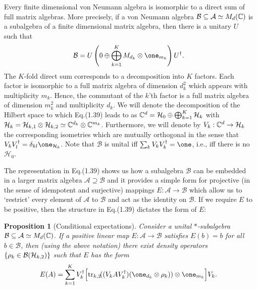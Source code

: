 \documentclass[11pt,a4paper]{article}
\theoremstyle{plain}
\newtheorem{proposition}{Proposition}[section]
\theoremstyle{definition}
\theoremstyle{remark}
\numberwithin{equation}{section}
\begin{document}
Every finite dimensional von Neumann algebra is isomorphic to a direct sum of full matrix algebras. More precisely, if a von Neumann algebra $\mathcal{B}\subseteq \mathcal{A}\simeq M_d(\mathbb{C})$ is a subalgebra of a finite dimensional matrix algebra, then there is a unitary $U$ such that
\begin{equation}
    \mathcal{B} = U\left(0 \oplus \bigoplus_{k=1}^{K} M_{d_k}\otimes \one_{m_k}\right)U^\dagger.
\end{equation}
The $K$-fold direct sum corresponds to a decomposition into $K$ factors. Each factor is isomorphic to a full matrix algebra of dimension $d_k^2$ which appears with multiplicity $m_k$. Hence, the commutant of the $k$'th factor is a full matrix algebra of dimension $m_k^2$ and multiplicity $d_k$. We will denote the decomposition of the Hilbert space to which Eq.(1.39) leads to as $\mathbb{C}^d=\mathcal{H}_0\oplus \bigoplus_{k=1}^{K} \mathcal{H}_k$ with $\mathcal{H}_k=\mathcal{H}_{k,1}\otimes \mathcal{H}_{k,2}\simeq \mathbb{C}^{d_k}\otimes \mathbb{C}^{m_k}$. Furthermore, we will denote by $V_k:\mathbb{C}^d\to \mathcal{H}_k$ the corresponding isometries which are mutually orthogonal in the sense that $V_kV_l^\dagger=\delta_{kl}\one_{\mathcal{H}_k}$. Note that $\mathcal{B}$ is unital iff $\sum_k V_kV_k^\dagger=\one$, i.e., iff there is no $\mathcal{H}_0$.

The representation in Eq.(1.39) shows us how a subalgebra $\mathcal{B}$ can be embedded in a larger matrix algebra $\mathcal{A}\supseteq \mathcal{B}$ and it provides a simple form for projective (in the sense of idempotent and surjective) mappings $E:\mathcal{A}\to \mathcal{B}$ which allow us to `restrict' every element of $\mathcal{A}$ to $\mathcal{B}$ and act as the identity on $\mathcal{B}$. If we require $E$ to be positive, then the structure in Eq.(1.39) dictates the form of $E$:

\begin{proposition}[Conditional expectations]
    Consider a unital $\ast$-subalgebra $\mathcal{B}\subseteq \mathcal{A}\simeq M_d(\mathbb{C})$. If a positive linear map $E:\mathcal{A}\to \mathcal{B}$ satisfies $E(b)=b$ for all $b\in \mathcal{B}$, then (using the above notation) there exist density operators $\{\rho_k\in \mathcal{B}(\mathcal{H}_{k,2})\}$ such that $E$ has the form
    \begin{equation}
        E(A) = \sum_{k=1}^{K}
        V_k^\dagger\Bigl[
            \tr_{k,2}\!((V_kAV_k^\dagger)(\one_{d_k}\otimes \rho_k))\otimes \one_{m_k}
            \Bigr]V_k.
    \end{equation}
\end{proposition}
\end{document}
